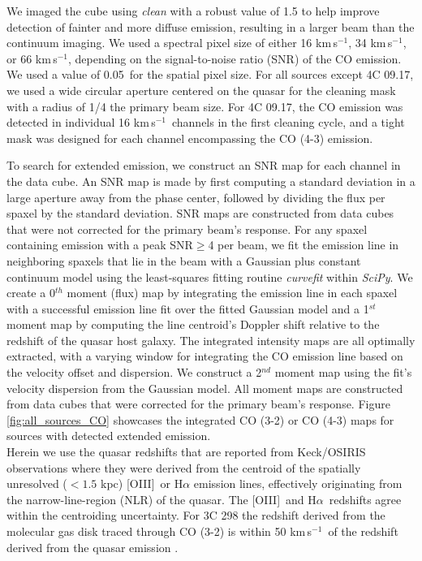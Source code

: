 \documentclass[twocolumn]{aastex63}
\newcommand{\ha}{H$\alpha$\xspace}
\newcommand{\oiii}{[O{\sc III}]\xspace}
\newcommand{\kms}{km\,s$^{-1}$}
\begin{document}
We imaged the cube using \textit{clean} with a robust value of 1.5 to help improve detection of fainter and more diffuse emission, resulting in a larger beam than the continuum imaging. We used a spectral pixel size of either 16 \kms, 34 \kms, or 66 \kms, depending on the signal-to-noise ratio (SNR) of the CO emission. We used a value of 0.05\arcsec\ for the spatial pixel size. For all sources except 4C 09.17, we used a wide circular aperture centered on the quasar for the cleaning mask with a radius of 1/4 the primary beam size. For 4C 09.17, the CO emission was detected in individual 16 \kms\ channels in the first cleaning cycle, and a tight mask was designed for each channel encompassing the CO (4-3) emission.


To search for extended emission, we construct an SNR map for each channel in the data cube. An SNR map is made by first computing a standard deviation in a large aperture away from the phase center, followed by dividing the flux per spaxel by the standard deviation. SNR maps are constructed from data cubes that were not corrected for the primary beam's response. For any spaxel containing emission with a peak SNR$\geq$4 per beam, we fit the emission line in neighboring spaxels that lie in the beam with a Gaussian plus constant continuum model using the least-squares fitting routine \textit{curvefit} within \textit{SciPy}. We create a 0$^{th}$ moment (flux) map by integrating the emission line in each spaxel with a successful emission line fit over the fitted Gaussian model and a 1$^{st}$ moment map by computing the line centroid's Doppler shift relative to the redshift of the quasar host galaxy. The integrated intensity maps are all optimally extracted, with a varying window for integrating the CO emission line based on the velocity offset and dispersion. We construct a 2$^{nd}$ moment map using the fit's velocity dispersion from the Gaussian model. All moment maps are constructed from data cubes that were corrected for the primary beam's response. Figure \ref{fig:all_sources_CO} showcases the integrated CO (3-2) or CO (4-3) maps for sources with detected extended emission.\\

Herein we use the quasar redshifts that are reported from Keck/OSIRIS observations \citep{Vayner19b} where they were derived from the centroid of the spatially unresolved ($<1.5$ kpc) \oiii\ or \ha emission lines, effectively originating from the narrow-line-region (NLR) of the quasar. The \oiii\ and \ha\ redshifts agree within the centroiding uncertainty. For 3C 298 the redshift derived from the molecular gas disk traced through CO (3-2) is within 50 \kms\ of the redshift derived from the quasar emission \citep{Vayner17}.
\end{document}
